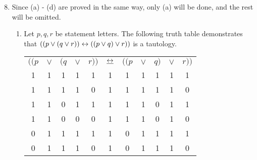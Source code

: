 \solutions{}
\begin{enumerate}
  \setcounter{enumi}{7}
  \item %
    Since (a) - (d) are proved in the same way, only (a) will be done, and the rest will be omitted.
    \begin{enumerate}[label=(\alph*), align=left]
      \item Let \(p, q, r\) be statement letters. The following truth table demonstrates that \(((p \lor (q \lor r)) \leftrightarrow ((p \lor q) \lor r))\) is a tautology.
        \begin{center}
          \begin{tabular}{ccccccccccc}
            \(((p\)&
            \(\lor\)&
            \((q\)&
            \(\lor\)&
            \(r))\)&
            \(\underline{\leftrightarrow}\)&
            \(((p\)&
            \(\lor\)&
            \(q)\)&
            \(\lor\)&
            \(r))\)\\

            1&  %
            1&  %
            1&  %
            1&  %
            1&  %
            1&  %
            1&  %
            1&  %
            1&  %
            1&  %
            1\\ %

            1&  %
            1&  %
            1&  %
            1&  %
            0&  %
            1&  %
            1&  %
            1&  %
            1&  %
            1&  %
            0\\ %

            1&  %
            1&  %
            0&  %
            1&  %
            1&  %
            1&  %
            1&  %
            1&  %
            0&  %
            1&  %
            1\\ %

            1&  %
            1&  %
            0&  %
            0&  %
            0&  %
            1&  %
            1&  %
            1&  %
            0&  %
            1&  %
            0\\ %

            0&  %
            1&  %
            1&  %
            1&  %
            1&  %
            1&  %
            0&  %
            1&  %
            1&  %
            1&  %
            1\\ %

            0&  %
            1&  %
            1&  %
            1&  %
            0&  %
            1&  %
            0&  %
            1&  %
            1&  %
            1&  %
            0\\ %


\end{tabular}
\end{center}
\end{enumerate}
\end{enumerate}
